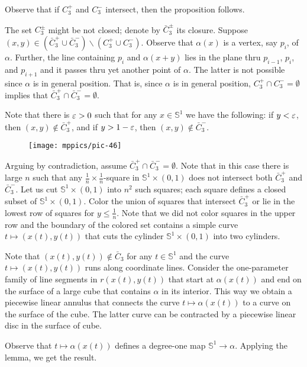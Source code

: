 Observe that if $C_3^+$ and $C_3^-$ intersect, then the proposition follows.

The set $C_3^\pm$ might be not closed;
denote by $\bar C_3^\pm$ its closure.
Suppose $(x,y)\in (\bar C_3^+\cup\bar C_3^-)\backslash( C_3^+\cup C_3^-)$.
Observe that $\alpha(x)$ is a vertex, say $p_i$, of $\alpha$.
Further, the line containing $p_i$ and $\alpha(x+y)$ lies in the plane thru $p_{i-1}$, $p_i$, and $p_{i+1}$ and it passes thru yet another point of $\alpha$.
The latter is not possible since $\alpha$ is in general position.
That is, since $\alpha$ is in general position, $C_3^+\cap C_3^-=\emptyset$ implies that $\bar C_3^+\cap \bar C_3^-=\emptyset$.

Note that there is $\varepsilon>0$ such that for any $x\in\mathbb{S}^1$ we have the following:
if $y<\varepsilon$, then $(x,y)\notin \bar C_3^+$,
and if $y>1-\varepsilon$, then $(x,y)\notin \bar C_3^-$.

\begin{wrapfigure}{r}{22 mm}
\vskip-0mm
\centering
\texttt{[image: mppics/pic-46]}
\vskip0mm
\end{wrapfigure}

Arguing by contradiction, assume $\bar C_3^+\cap \bar C_3^-=\emptyset$.
Note that in this case there is large $n$ such that any $\tfrac1n\times\tfrac1n$-square in $\mathbb{S}^1\times (0,1)$ does not intersect both $\bar C_3^+$ and $\bar C_3^-$.
Let us cut $\mathbb{S}^1\times (0,1)$ into $n^2$ such squares; each square defines a closed subset of $\mathbb{S}^1\times (0,1)$.
Color the union of squares that intersect $\bar C_3^+$ or lie in the lowest row of squares for $y\le \tfrac1n$.
Note that we did not color squares in the upper row and the boundary of the colored set contains a simple curve $t\mapsto(x(t),y(t))$ that cuts  the cylinder $\mathbb{S}^1\times (0,1)$ into two cylinders.

Note that $(x(t),y(t))\notin \bar C_3$ for any $t\in \mathbb{S}^1$ and the curve $t\mapsto(x(t),y(t))$ runs along coordinate lines.
Consider the one-parameter family of line segments in $r(x(t),y(t))$ that start at $\alpha(x(t))$ and end on the surface of a large cube that contains $\alpha$ in its interior.
This way we obtain a piecewise linear annulus that connects the curve $t\mapsto \alpha(x(t))$ to a curve on the surface of the cube.
The latter curve can be contracted by a piecewise linear disc in the surface of cube.

Observe that $t\mapsto \alpha(x(t))$ defines a degree-one map $\mathbb{S}^1\to\alpha$.
Applying the lemma, we get the result.
\qeds





